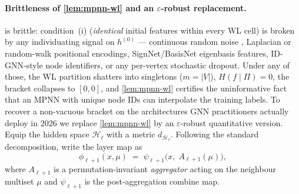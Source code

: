 \documentclass[10pt]{article}
\theoremstyle{definition}
\theoremstyle{remark}
\begin{document}
\paragraph{Brittleness of \cref{lem:mpnn-wl} and an
$\varepsilon$-robust replacement.}  is
brittle: condition~(i) (\emph{identical} initial features
within every WL cell) is broken by any individuating signal
on $h^{(0)}$ --- continuous random noise
\citep{sato2020random}, Laplacian or random-walk positional
encodings, SignNet/BasisNet eigenbasis features, ID-GNN-style
node identifiers, or any per-vertex stochastic dropout. Under
any of those, the WL partition shatters into singletons
($m = |V|$), $H(f \mid \Pi) = 0$, the bracket collapses to
$[0,0]$, and \cref{lem:mpnn-wl} certifies the
uninformative fact that an MPNN with unique node IDs can
interpolate the training labels. To recover a non-vacuous
bracket on the architectures GNN practitioners actually
deploy in 2026 we replace \cref{lem:mpnn-wl} by an
$\varepsilon$-robust quantitative version. Equip the hidden
space $\mathcal{H}_{\ell}$ with a metric
$d_{\mathcal{H}_{\ell}}$. Following the standard decomposition,
write the layer map as
\[
  \phi_{\ell+1}(x, \mu)
  \;=\; \psi_{\ell+1}\!\bigl(x,\; A_{\ell+1}(\mu)\bigr),
\]
where $A_{\ell+1}$ is a permutation-invariant
\emph{aggregator} acting on the neighbour multiset $\mu$ and
$\psi_{\ell+1}$ is the post-aggregation combine map.
\end{document}
